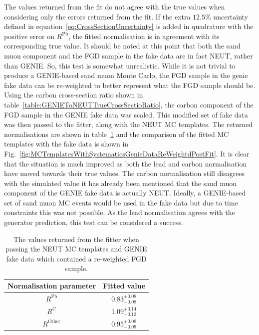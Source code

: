 The values returned from the fit do not agree with the true values when considering only the errors returned from the fit.  If the extra $12.5\%$ uncertainty defined in equation~\ref{eq:CrossSectionUncertainty} is added in quadrature with the positive error on $R^{\textrm{Pb}}$, the fitted normalisation is in agreement with its corresponding true value.  It should be noted at this point that both the sand muon component and the FGD sample in the fake data are in fact NEUT, rather than GENIE.  So, this test is somewhat unrealistic.  While it is not trivial to produce a GENIE-based sand muon Monte Carlo, the FGD sample in the genie fake data can be re-weighted to better represent what the FGD sample should be.  Using the carbon cross-section ratio shown in table~\ref{table:GENIEToNEUTTrueCrossSectioRatio}, the carbon component of the FGD sample in the GENIE fake data was scaled.  This modified set of fake data was then passed to the fitter, along with the NEUT MC templates.  The returned normalisations are shown in table~\ref{table:NEUTMCTemplatesGENIEDataReweightFGDPostFit} and the comparison of the fitted MC templates with the fake data is shown in Fig.~\ref{fig:MCTemplatesWithSystematicsGenieDataReWeightdPostFit}.  It is clear that the situation is much improved as both the lead and carbon normalisation have moved towards their true values.  The carbon normalisation still disagrees with the simulated value it has already been mentioned that the sand muon component of the GENIE fake data is actually NEUT.  Ideally, a GENIE-based set of sand muon MC events would be used in the fake data but due to time constraints this was not possible.  As the lead normalisation agrees with the generator prediction, this test can be considered a success.
\begin{table}
  \begin{tabular}{c c }
    Normalisation parameter & Fitted value \\ \hline \hline
    $R^{\textrm{Pb}}$ & $0.83^{+0.08}_{-0.08}$  \\
    $R^{\textrm{C}}$ & $1.09^{+0.14}_{-0.12}$  \\
    $R^{\textrm{Other}}$ & $0.95^{+0.08}_{-0.09}$  \\
  \end{tabular}
  \caption{The values returned from the fitter when passing the NEUT MC templates and GENIE fake data which contained a re-weighted FGD sample.}
  \label{table:NEUTMCTemplatesGENIEDataReweightFGDPostFit}
\end{table}
